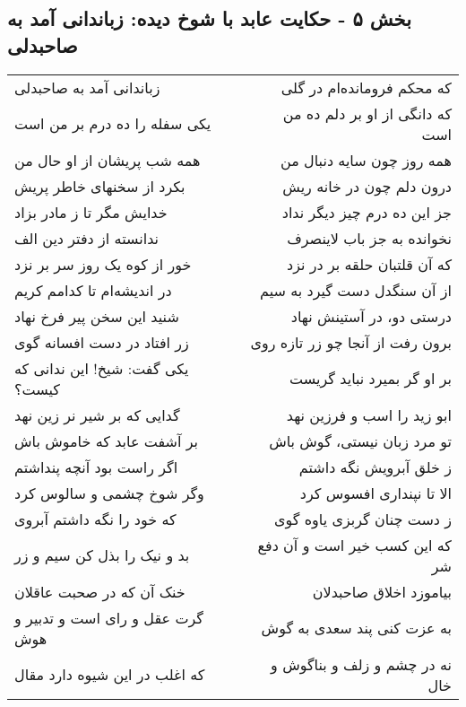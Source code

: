 \begin{center}
\section*{بخش ۵ - حکایت عابد با شوخ دیده: زباندانی آمد به صاحبدلی}
\label{sec:005}
\begin{longtable}{l p{0.5cm} r}
زباندانی آمد به صاحبدلی
&&
که محکم فرومانده‌ام در گلی
\\
یکی سفله را ده درم بر من است
&&
که دانگی از او بر دلم ده من است
\\
همه شب پریشان از او حال من
&&
همه روز چون سایه دنبال من
\\
بکرد از سخنهای خاطر پریش
&&
درون دلم چون در خانه ریش
\\
خدایش مگر تا ز مادر بزاد
&&
جز این ده درم چیز دیگر نداد
\\
ندانسته از دفتر دین الف
&&
نخوانده به جز باب لاینصرف
\\
خور از کوه یک روز سر بر نزد
&&
که آن قلتبان حلقه بر در نزد
\\
در اندیشه‌ام تا کدامم کریم
&&
از آن سنگدل دست گیرد به سیم
\\
شنید این سخن پیر فرخ نهاد
&&
درستی دو، در آستینش نهاد
\\
زر افتاد در دست افسانه گوی
&&
برون رفت از آنجا چو زر تازه روی
\\
یکی گفت: شیخ! این ندانی که کیست؟
&&
بر او گر بمیرد نباید گریست
\\
گدایی که بر شیر نر زین نهد
&&
ابو زید را اسب و فرزین نهد
\\
بر آشفت عابد که خاموش باش
&&
تو مرد زبان نیستی، گوش باش
\\
اگر راست بود آنچه پنداشتم
&&
ز خلق آبرویش نگه داشتم
\\
وگر شوخ چشمی و سالوس کرد
&&
الا تا نپنداری افسوس کرد
\\
که خود را نگه داشتم آبروی
&&
ز دست چنان گربزی یاوه گوی
\\
بد و نیک را بذل کن سیم و زر
&&
که این کسب خیر است و آن دفع شر
\\
خنک آن که در صحبت عاقلان
&&
بیاموزد اخلاق صاحبدلان
\\
گرت عقل و رای است و تدبیر و هوش
&&
به عزت کنی پند سعدی به گوش
\\
که اغلب در این شیوه دارد مقال
&&
نه در چشم و زلف و بناگوش و خال
\\
\end{longtable}
\end{center}
